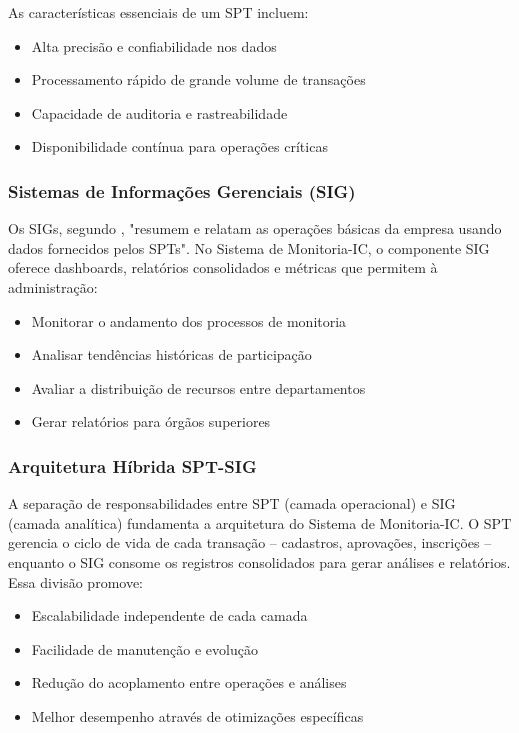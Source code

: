 \documentclass[portuguese]{sbc2025}%
\begin{document}
As características essenciais de um SPT incluem:
\begin{itemize}
  \item Alta precisão e confiabilidade nos dados
  \item Processamento rápido de grande volume de transações
  \item Capacidade de auditoria e rastreabilidade
  \item Disponibilidade contínua para operações críticas
\end{itemize}

\subsubsection{Sistemas de Informações Gerenciais (SIG)}

Os SIGs, segundo \cite{Laudon_Laudon_2011}, "resumem e relatam as operações básicas da empresa usando dados fornecidos pelos SPTs". No Sistema de Monitoria-IC, o componente SIG oferece dashboards, relatórios consolidados e métricas que permitem à administração:
\begin{itemize}
  \item Monitorar o andamento dos processos de monitoria
  \item Analisar tendências históricas de participação
  \item Avaliar a distribuição de recursos entre departamentos
  \item Gerar relatórios para órgãos superiores
\end{itemize}

\subsubsection{Arquitetura Híbrida SPT-SIG}

A separação de responsabilidades entre SPT (camada operacional) e SIG (camada analítica) fundamenta a arquitetura do Sistema de Monitoria-IC. O SPT gerencia o ciclo de vida de cada transação – cadastros, aprovações, inscrições – enquanto o SIG consome os registros consolidados para gerar análises e relatórios. Essa divisão promove:
\begin{itemize}
  \item Escalabilidade independente de cada camada
  \item Facilidade de manutenção e evolução
  \item Redução do acoplamento entre operações e análises
  \item Melhor desempenho através de otimizações específicas
\end{itemize}
\end{document}
